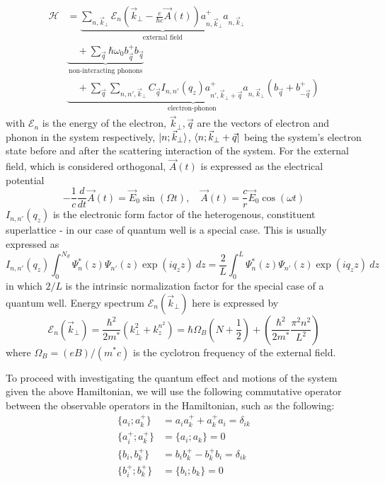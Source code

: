 \documentclass{article}
\begin{document}
\begin{align}
    \mathcal{H}& = \underbrace{\sum_{n,\vec{k}_{\perp}} \mathcal{E}_{n}\left(\vec{k}_{\perp} - \frac{e}{\hbar c} \vec{A}(t)\right)a^{+}_{n,\vec{k}_{\perp}} a_{n,\vec{k}_{\perp}} }_{\text{external field}} \\ 
    & \underbrace{\quad + \sum_{\vec{q}} \hbar \omega_{0} b_{\vec{q}}^{+} b_{\vec{q}}}_{\text{non-interacting phonons} } \\
    & \underbrace{\quad + \sum_{\vec{q}} \sum_{n,n', \vec{k}_{\perp}} C_{\vec{q}} I_{n,n'}(q_{z}) a^{+}_{n',\vec{k}_{\perp}+\vec{q}} a_{n,\vec{k}_{\perp}} \left(b_{\vec{q}} + b^{+}_{- \vec{q}}\right)}_{\text{electron-phonon }}
\end{align}
with $\mathcal{E}_{n}$ is the energy of the electron, $\vec{k}_{\perp}, \vec{q}$ are the vectors of electron and phonon in the system respectively, $\ket{n; \vec{k}_{\perp}}$, $\bra{n;\vec{k}_{\perp}+\vec{q}}$ being the system's electron state before and after the scattering interaction of the system. For the external field, which is considered orthogonal, $\vec{A}(t)$ is expressed as the electrical potential 
\begin{equation}
    -\frac{1}{c} \frac{d}{dt} \vec{A}(t) = \vec{E}_{0}\sin{(\Omega t)},\quad  \vec{A}(t) = \frac{c}{r} \vec{E}_{0}\cos{(\omega t )}
\end{equation}
$I_{n,n'}(q_{z})$ is the electronic form factor of the heterogenous, constituent superlattice - in our case of quantum well is a special case. This is usually expressed as 
\begin{equation}
    I_{n,n'}(q_{z}) \int_{0}^{N_{d}} \Psi^{*}_{n}(z) \Psi_{n'}(z)\exp{(iq_{z}z)}\: dz = \frac{2}{L} \int_{0}^{L} \Psi^{*}_{n}(z)\Psi_{n'}(z)\exp{(iq_{z}z)}\: dz
\end{equation}
in which $2/L$ is the intrinsic normalization factor for the special case of a quantum well. Energy spectrum $\mathcal{E}_{n}(\vec{k}_{\perp})$ here is expressed by 
\begin{equation}
    \mathcal{E}_{n}(\vec{k}_{\perp}) = \frac{\hbar^{2}}{2m^{*}} \left( k_{\perp}^{2} + k_{z}^{n^{2}} \right) = \hbar \Omega_{B} \left(N + \frac{1}{2}\right) + \left(\frac{\hbar^{2}}{2m^{*}} \frac{\pi^{2}n^{2}}{L^{2}}\right)
\end{equation}
where $\Omega_{B}=(eB)/(m^{*}c)$ is the cyclotron frequency of the external field. 

To proceed with investigating the quantum effect and motions of the system given the above Hamiltonian, we will use the following commutative operator between the observable operators in the Hamiltonian, such as the following: 
\begin{align}
    \{ a_{i} ; a_{k}^{+} \} &= a_{i}a_{k}^{+} + a^{+}_{k}a_{i} = \delta_{ik} \\
    \{ a_{i}^{+} ; a_{k}^{+} \} & = \{ a_{i}; a_{k} \} = 0 \\
    \{ b_{i} , b_{k}^{+} \} & = b_{i}b^{+}_{k} - b_{k}^{+}b_{i} = \delta_{ik} \\
    \{ b_{i}^{+}; b_{k}^{+} \} &= \{b_{i} ; b_{k}\} = 0
\end{align}
\end{document}

